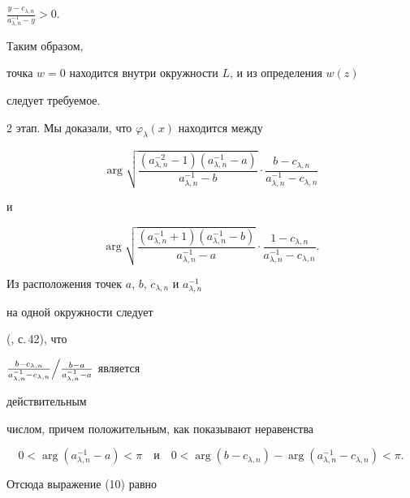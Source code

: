 \begin{pf}
$\frac{y-c_{\lambda,n}}{a^{-1}_{\lambda,n}-y}>0$.


Таким образом,


точка $w=0$ находится внутри окружности $L$, и из определения $w(z)$


следует требуемое.





2 этап. Мы доказали, что $\varphi_\lambda(x)$ находится между


\begin{equation}


\arg\sqrt{\frac{(a^{-2}_{\lambda,n}-1)(a^{-1}_{\lambda,n}-a)}


{a^{-1}_{\lambda,n}-b}}\cdot\frac{b-c_{\lambda,n}}


{a^{-1}_{\lambda,n}-c_{\lambda,n}}


\end{equation}


и


\begin{equation}


\arg\sqrt{\frac{(a^{-1}_{\lambda,n}+1)(a^{-1}_{\lambda,n}-b)}


{a^{-1}_{\lambda,n}-a}}\cdot\frac{1-c_{\lambda,n}}


{a^{-1}_{\lambda,n}-c_{\lambda,n}}.


\end{equation}


Из расположения точек $a$, $b$, $c_{\lambda,n}$ и $a^{-1}_{\lambda,n}$


на одной окружности следует


(\cite{16}, с.\,42), что\linebreak


$\Bigl.\frac{b-c_{\lambda,n}}{a^{-1}_{\lambda,n}-c_{\lambda,n}}


\Bigr/\frac{b-a}{a^{-1}_{\lambda,n}-a}$ является


действительным


числом, причем положительным, как показывают неравенства


$$


0<\arg(a^{-1}_{\lambda,n}-a)<\pi\quad


\text{и}\quad


0<\arg(b-c_{\lambda,n})-\arg(a^{-1}_{\lambda,n}-c_{\lambda,n})<\pi.


$$


Отсюда выражение (10) равно


\begin{equation}



\end{equation}
\end{pf}
